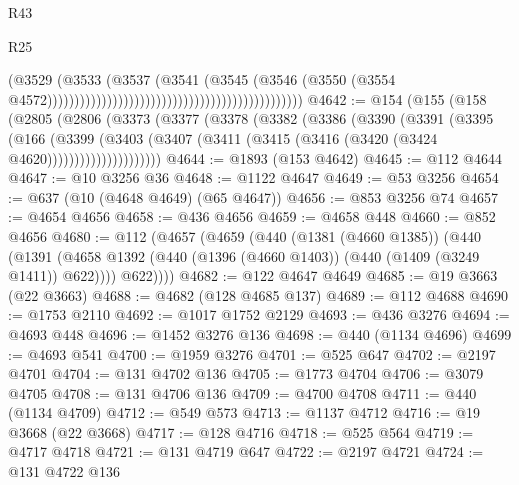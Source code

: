 \begin{lexlean}{R43}
\begin{lexlean}{R25}
\begin{coremodule}
{{{{{{{{{{{{{{{{{{{{{{{{{{{{{{{{{{{{{{{{{{{{{{{{{{{{{{{{{{{{{{{{{{{{{{{{{{{{{{{{{{{{{{{{{{{{{{{{{{{{{{{{{{{{{{{{{{{{{{{{{{{{{{{{{{{{{{{{{{{{{{{{{{{{{{{{{{{{{{{{{{{{{{{{{{{{{{{{{{{{{{{{{{{{{{{{{                                                                                  (@3529
                                                                                    (@3533
                                                                                      (@3537
                                                                                        (@3541
                                                                                          (@3545
                                                                                            (@3546
                                                                                              (@3550
                                                                                                (@3554
                                                                                                  @4572)))))))))))))))))))))))))))))))))))))))))))))))
@4642 := @154
    (@155
      (@158
        (@2805
          (@2806
            (@3373
              (@3377
                (@3378
                  (@3382
                    (@3386
                      (@3390
                        (@3391
                          (@3395
                            (@166
                              (@3399
                                (@3403
                                  (@3407
                                    (@3411 (@3415 (@3416 (@3420 (@3424 @4620)))))))))))))))))))))
@4644 := @1893 (@153 @4642)
@4645 := @112 @4644
@4647 := @10 @3256 @36
@4648 := @1122 @4647
@4649 := @53 @3256
@4654 := @637 (@10 (@4648 @4649) (@65 @4647))
@4656 := @853 @3256 @74
@4657 := @4654 @4656
@4658 := @436 @4656
@4659 := @4658 @448
@4660 := @852 @4656
@4680 := @112
    (@4657
      (@4659
        (@440
          (@1381 (@4660 @1385))
          (@440
            (@1391 (@4658 @1392 (@440 (@1396 (@4660 @1403)) (@440 (@1409 (@3249 @1411)) @622))))
            @622))))
@4682 := @122 @4647 @4649
@4685 := @19 @3663 (@22 @3663)
@4688 := @4682 (@128 @4685 @137)
@4689 := @112 @4688
@4690 := @1753 @2110
@4692 := @1017 @1752 @2129
@4693 := @436 @3276
@4694 := @4693 @448
@4696 := @1452 @3276 @136
@4698 := @440 (@1134 @4696)
@4699 := @4693 @541
@4700 := @1959 @3276
@4701 := @525 @647
@4702 := @2197 @4701
@4704 := @131 @4702 @136
@4705 := @1773 @4704
@4706 := @3079 @4705
@4708 := @131 @4706 @136
@4709 := @4700 @4708
@4711 := @440 (@1134 @4709)
@4712 := @549 @573
@4713 := @1137 @4712
@4716 := @19 @3668 (@22 @3668)
@4717 := @128 @4716
@4718 := @525 @564
@4719 := @4717 @4718
@4721 := @131 @4719 @647
@4722 := @2197 @4721
@4724 := @131 @4722 @136
}}}}}}}}}}}}}}}}}}}}}}}}}}}}}}}}}}}}}}}}}}}}}}}}}}}}}}}}}}}}}}}}}}}}}}}}}}}}}}}}}}}}}}}}}}}}}}}}}}}}}}}}}}}}}}}}}}}}}}}}}}}}}}}}}}}}}}}}}}}}}}}}}}}}}}}}}}}}}}}}}}}}}}}}}}}}}}}}}}}}}}}}}}}}}}}}}
\end{coremodule}
\end{lexlean}
\end{lexlean}
